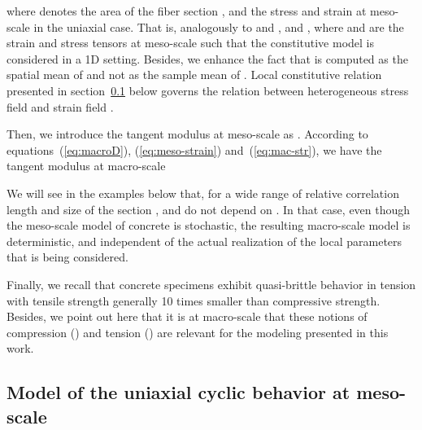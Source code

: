 \documentclass[12p]{amsart}
\begin{document}
where  denotes the area of the fiber section ,  and  the stress and strain at meso-scale in the uniaxial case. That is, analogously to  and ,  and , where  and  are the strain and stress tensors at meso-scale such that the constitutive model is considered in a 1D setting. Besides, we enhance the fact that  is computed as the spatial mean of  and not as the sample mean of . Local constitutive relation presented in section~\ref{sec:beh-law-con} below governs the relation between heterogeneous stress field  and strain field .

Then, we introduce the tangent modulus at meso-scale  as . According to equations~(\ref{eq:macroD}), (\ref{eq:meso-strain}) and~(\ref{eq:mac-str}), we have the tangent modulus at macro-scale

We will see in the examples below that, for a wide range of relative correlation length and size of the section ,  and  do not depend on . In that case, even though the meso-scale model of concrete is stochastic, the resulting macro-scale model is deterministic, and independent of the actual realization of the local parameters that is being considered.
 
Finally, we recall that concrete specimens exhibit quasi-brittle behavior in tension with tensile strength generally 10 times smaller than compressive strength. Besides, we point out here that it is at macro-scale that these notions of compression () and tension () are relevant for the modeling presented in this work. 

\subsection{Model of the uniaxial cyclic behavior at meso-scale}\label{sec:beh-law-con}
\end{document}
